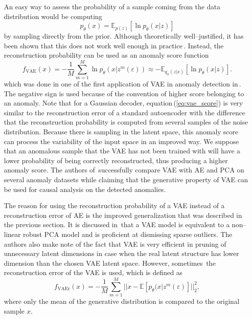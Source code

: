 An easy way to assess the probability of a sample coming from the
data distribution would be computing 
\begin{equation}
p_{\theta}(x)=\mathbb{E}_{p(z)}\left[\ln p_{\theta}(x|z)\right]
\end{equation}
by sampling directly from the prior. Although theoretically well--justified,
it has been shown that this does not work well enough in practice\,\cite{xu2018unsupervised}.
Instead, the reconstruction probability can be used as an anomaly
score function
\begin{equation}
f_{\text{VAE}}(x)=-\frac{1}{M}\sum_{m=1}^{M}\ln p_{\theta}(x|z^{m}(\varepsilon))\approx-\mathbb{E}_{q_{\phi}(z|x)}\left[\ln p_{\theta}(x|z)\right].\label{eq:vae_score}
\end{equation}
which was done in one of the first application of VAE in anomaly detection
in\,\cite{an2015variational}. The negative sign is used because
of the convention of higher score belonging to an anomaly. Note that
for a Gaussian decoder, equation\,(\ref{eq:vae_score}) is very similar
to the reconstruction error of a standard autoencoder with the difference
that the reconstruction probability is computed from several samples
of the noise distribution. Because there is sampling in the latent
space, this anomaly score can process the variability of the input
space in an improved way. We suppose that an anomalous sample that
the VAE has not been trained with will have a lower probability of
being correctly reconstructed, thus producing a higher anomaly score.
The authors of\,\cite{an2015variational} successfully compare VAE
with AE and PCA on several anomaly datasets while claiming that the
generative property of VAE can be used for causal analysis on the
detected anomalies.

The reason for using the reconstruction probability of a VAE instead
of a reconstruction error of AE is the improved generalization that
was described in the previous section. It is discussed in\,\cite{dai2017hidden}
that a VAE model is equivalent to a non--linear robust PCA model
and is proficient at dismissing sparse outliers. The authors also
make note of the fact that VAE is very efficient in pruning of unnecessary
latent dimensions in case when the real latent structure has lower
dimension than the chosen VAE latent space. However, sometimes\,\cite{pereira2018unsupervised}
the reconstruction error of the VAE is used, which is defined as
\begin{equation}
f_{\text{VAEr}}(x)=-\frac{1}{M}\sum_{m=1}^{M}||x-\mathbb{E}\left[p_{\theta}(x|z^{m}(\varepsilon)\right]||_{2}^{2},
\end{equation}
where only the mean of the generative distribution is compared to
the original sample $x$.

